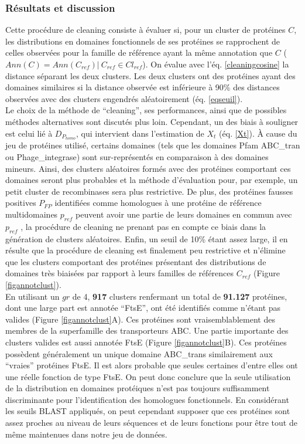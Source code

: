 \subsubsection{Résultats et discussion}\label{parcleaningres}
	Cette procédure de cleaning consiste à évaluer si, pour un cluster de protéines $C$, les distributions en domaines fonctionnels de ses protéines se rapprochent de celles observées pour la famille de référence ayant la même annotation que $C$ ($Ann(C)=Ann(C_{ref})| \: C_{ref} \in Cl_{ref}$). On évalue avec l'éq.  \ref{cleaningcosine} la distance séparant les deux clusters. Les deux clusters ont des protéines ayant des domaines similaires si la distance observée est inférieure à 90\% des distances observées avec des clusters engendrés aléatoirement (éq. \ref{eqseuil}). \\
Le choix de la méthode de “cleaning”, ses performances, ainsi que de possibles méthodes alternatives sont discutés plus loin. Cependant, un des biais à souligner est celui lié à $D_{P_{homo}}$, qui intervient dans l'estimation de $X_{t}$ (éq. \ref{Xt}). À cause du jeu de protéines utilisé, certains domaines (tels que les domaines Pfam ABC\_tran ou Phage\_integrase) sont sur-représentés en comparaison à des domaines mineurs.  Ainsi, des clusters aléatoires formés avec des protéines comportant ces domaines seront plus probables et la méthode d'évaluation pour, par exemple, un petit cluster de recombinases sera plus restrictive. De plus, des protéines fausses positives $P_{FP}$ identifiées comme homologues à une protéine de référence multidomaines $p_{ref}$ peuvent avoir une partie de leurs domaines en commun avec $p_{ref}$ \citep{Song2007}, la procédure de cleaning ne prenant pas en compte ce biais dans la génération de clusters aléatoires. Enfin, un seuil de 10\% étant assez large, il en résulte que la procédure de cleaning est finalement peu restrictive et n'élimine que les clusters comportant des protéines présentant des distributions de domaines très biaisées par rapport à leurs familles de références $C_{ref}$ (Figure \ref{figannotclust}).\\ 
	En utilisant un $gr$ de 4, \textbf{917} clusters renfermant un total de \textbf{91.127} protéines, dont une large part est annotée “FtsE”, ont été identifiés comme n'étant pas valides (Figure \ref{figannotclust}A). Ces protéines sont vraisemblablement des membres de la superfamille des transporteurs ABC. Une partie importante des clusters valides est aussi annotée FtsE (Figure \ref{figannotclust}B). Ces protéines possèdent généralement un unique domaine ABC\_trans similairement aux “vraies” protéines FtsE. Il est alors probable que seules certaines d'entre elles ont une réelle fonction de type FtsE. On peut donc conclure que la seule utilisation de la distribution en domaines protéiques n'est pas toujours suffisamment discriminante pour l'identification des homologues fonctionnels. En considérant les seuils BLAST appliqués, on peut cependant supposer que ces protéines sont assez proches au niveau de leurs séquences et de leurs fonctions pour être tout de même maintenues dans notre jeu de données. 
	
